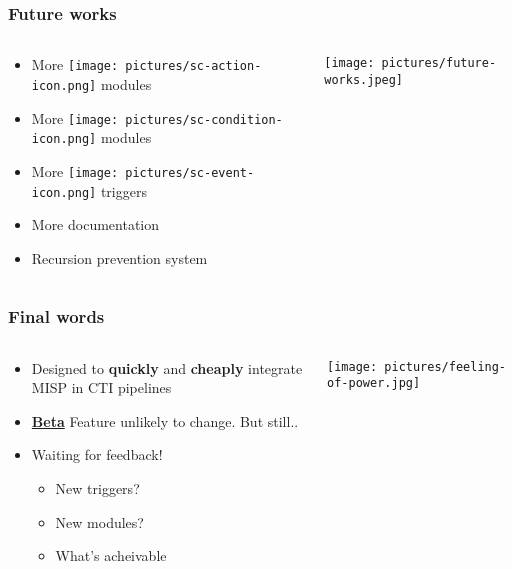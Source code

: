 \begin{frame}
    \frametitle{Future works}
    \begin{columns}
        \begin{column}{0.55\textwidth}
            \begin{itemize}
                \item More \texttt{[image: pictures/sc-action-icon.png]} modules
                \item More \texttt{[image: pictures/sc-condition-icon.png]} modules
                \item More \texttt{[image: pictures/sc-event-icon.png]} triggers
                \item More documentation
                \item Recursion prevention system
            \end{itemize}
        \end{column}
        \begin{column}{0.45\textwidth}
            \texttt{[image: pictures/future-works.jpeg]}
        \end{column}
    \end{columns}
\end{frame}

\begin{frame}
    \frametitle{Final words}
    \begin{columns}
        \begin{column}{0.6\textwidth}
            \begin{itemize}
                \item Designed to \textbf{quickly} and \textbf{cheaply} integrate MISP in CTI pipelines
                \item \underline{\textbf{Beta}} Feature unlikely to change. But still..
                \item Waiting for feedback!
                \begin{itemize}
                    \item New triggers?
                    \item New modules?
                    \item What's acheivable
                \end{itemize}
            \end{itemize}
        \end{column}
        \begin{column}{0.4\textwidth}
            \texttt{[image: pictures/feeling-of-power.jpg]}
        \end{column}
    \end{columns}
    \vspace*{0.5em}
\end{frame}

